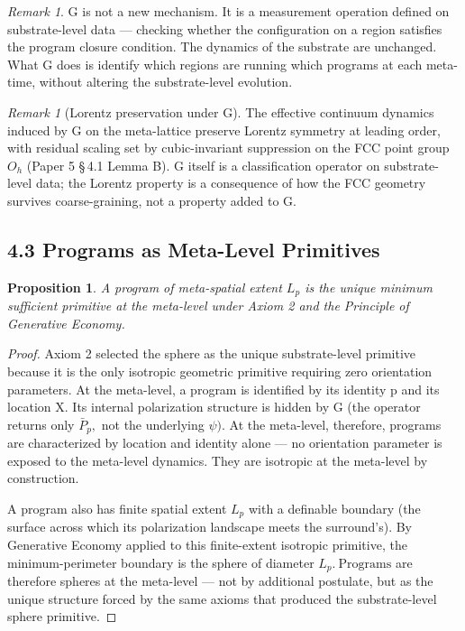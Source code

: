 \documentclass[11pt,oneside]{report}
\newtheorem{proposition}[theorem]{Proposition}
\theoremstyle{definition}
\theoremstyle{remark}
\newtheorem{remark}[theorem]{Remark}
\begin{document}
\begin{remark}
G is not a new mechanism. It is a measurement operation defined
on substrate-level data --- checking whether the configuration on a
region satisfies the program closure condition. The dynamics of the
substrate are unchanged. What G does is identify which regions are
running which programs at each meta-time, without altering the
substrate-level evolution.
\end{remark}

\begin{remark}[Lorentz preservation under G]
The effective continuum dynamics
induced by G on the meta-lattice preserve Lorentz symmetry at leading
order, with residual scaling set by cubic-invariant suppression on the
FCC point group \ensuremath{O_{h}} (Paper 5 \S\,4.1 Lemma B). G itself is a
classification operator on substrate-level data; the Lorentz property is
a consequence of how the FCC geometry survives coarse-graining, not a
property added to G.
\end{remark}

\subsection*{4.3 Programs as Meta-Level Primitives}

\begin{proposition}
A program of meta-spatial extent \ensuremath{L_{p}} is the unique minimum
sufficient primitive at the meta-level under Axiom 2 and the Principle
of Generative Economy.
\end{proposition}

\begin{proof}
Axiom 2 selected the sphere as the unique substrate-level
primitive because it is the only isotropic geometric primitive requiring
zero orientation parameters. At the meta-level, a program is identified
by its identity p and its location X. Its internal polarization
structure is hidden by G (the operator returns only \ensuremath{\bar{P}_{p},} not the
underlying \ensuremath{\psi ).} At the meta-level, therefore, programs are characterized
by location and identity alone --- no orientation parameter is exposed
to the meta-level dynamics. They are isotropic at the meta-level by
construction.

A program also has finite spatial extent \ensuremath{L_{p}} with a definable boundary
(the surface across which its polarization landscape meets the
surround's). By Generative Economy applied to this finite-extent
isotropic primitive, the minimum-perimeter boundary is the sphere of
diameter \ensuremath{L_{p}.~\text{Programs}} are therefore spheres at the meta-level --- not
by additional postulate, but as the unique structure forced by the same
axioms that produced the substrate-level sphere primitive.

\end{proof}
\end{document}
